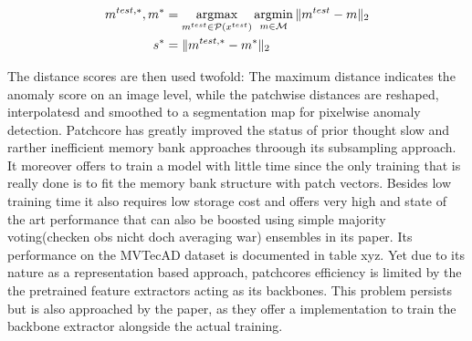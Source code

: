 \begin{equation}
\label{ew:patchcoredistance}
\begin{split}
m^{test, *}, m^{*} &= \operatorname*{argmax}_{m^{test} \in \mathcal{P}(x^{test})} \operatorname*{argmin}_{m \in \mathcal{M}} \| m^{test} - m \|_{2} \\
s^{*} &= \| m^{test, *} - m^{*} \|_{2}
\end{split}
\end{equation}

The distance scores are then used twofold: The maximum distance indicates the anomaly score on an image level, while the patchwise distances are reshaped, interpolatesd and smoothed to a segmentation 
map for pixelwise anomaly detection.
\newline
Patchcore has greatly improved the status of prior thought slow and rarther inefficient memory bank approaches throough its subsampling approach. It moreover offers to train a model with little time 
since the only training that is really done is to fit the memory bank structure with patch vectors. Besides low training time it also requires low storage cost and offers very high and state of the art 
performance that can also be boosted using simple majority voting(checken obs nicht doch averaging war) ensembles in its paper. Its performance on the MVTecAD dataset is documented in table xyz. Yet due to its nature as a representation based approach, patchcores 
efficiency is limited by the the pretrained feature extractors acting as its backbones. This problem persists but is also approached by the paper, as they offer a implementation to train the backbone 
extractor alongside the actual training.


